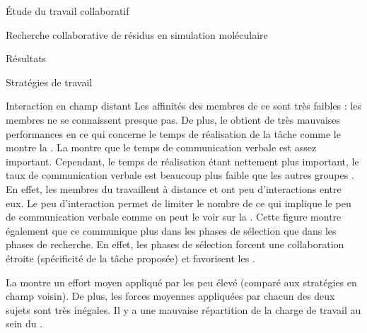 \documentclass[myfrancais]{mythesis}
\begin{document}
\begin{mypart}{Étude du travail collaboratif}
\begin{mychapter}{Recherche collaborative de résidus en simulation moléculaire}
\begin{mysection}{Résultats}
\begin{mysubsection}{Stratégies de travail}
\begin{mysubsubsection}{Interaction en champ distant}
						Les affinités des membres de ce  sont très faibles  : les membres ne se connaissent presque pas.
						De plus, le  obtient de très mauvaises performances en ce qui concerne le temps de réalisation de la tâche comme le montre la .
						La  montre que le temps de communication verbale est assez important.
						Cependant, le temps de réalisation étant nettement plus important, le taux de communication verbale est beaucoup plus faible que les autres groupes .
						En effet, les membres du  travaillent à distance et ont peu d'interactions entre eux.
						Le peu d'interaction permet de limiter le nombre de  ce qui implique le peu de communication verbale comme on peut le voir sur la .
						Cette figure montre également que ce  communique plus dans les phases de sélection que dans les phases de recherche.
						En effet, les phases de sélection forcent une collaboration étroite (spécificité de la tâche proposée) et favorisent les .

						La  montre un effort moyen appliqué par les  peu élevé (comparé aux stratégies en champ voisin).
						De plus, les forces moyennes appliquées par chacun des deux sujets sont très inégales.
						Il y a une mauvaise répartition de la charge de travail au sein du .


\end{mysubsubsection}
\end{mysubsection}
\end{mysection}
\end{mychapter}
\end{mypart}
\end{document}
